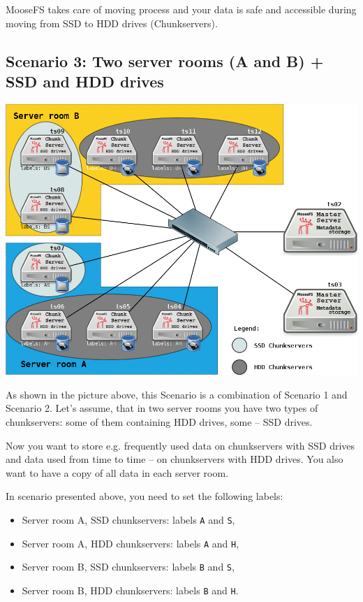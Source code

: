 \documentclass[a4paper,11pt,english]{report}
\def\code#1{\texttt{#1}}
\begin{document}
			MooseFS takes care of moving process and your data is safe and accessible during moving from SSD to HDD drives (Chunkservers).
	
			\pagebreak
			
			\subsection{Scenario 3: Two server rooms (A and B) + SSD and HDD drives}
			
			\includegraphics[scale=0.5]{images/diagram_A_B_ssd_hdd_v2.png}
	
			As shown in the picture above, this Scenario is a combination of Scenario 1 and Scenario 2. Let's assume, that in two server rooms you have two types of chunkservers: some of them containing HDD drives, some -- SSD drives.
			
			Now you want to store e.g. frequently used data on chunkservers with SSD drives and data used from time to time -- on chunkservers with HDD drives. You also want to have a copy of all data in each server room.
			
			In scenario presented above, you need to set the following labels:
			\begin{itemize}
				\item Server room A, SSD chunkservers: labels \code{A} and \code{S},
				\item Server room A, HDD chunkservers: labels \code{A} and \code{H},
				\item Server room B, SSD chunkservers: labels \code{B} and \code{S},
				\item Server room B, HDD chunkservers: labels \code{B} and \code{H}.
			\end{itemize}
			
\end{document}
